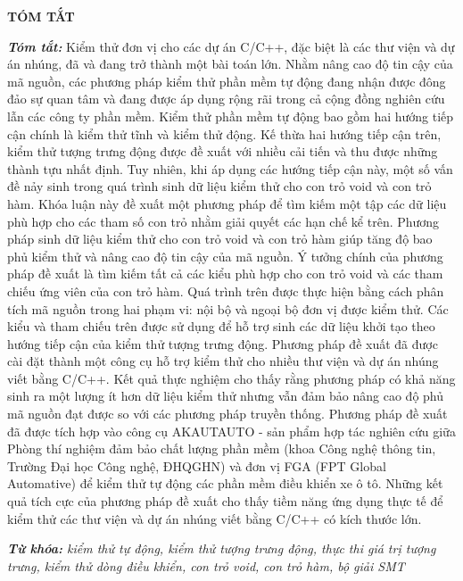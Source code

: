 \newpage
{}
\begin{center}
    \textbf{TÓM TẮT}
\end{center}
\changefontsizes[16pt]{12pt}
\textit{\textbf{Tóm tắt: }} 
Kiểm thử đơn vị cho các dự án C/C++, đặc biệt là các thư viện và dự án nhúng, đã và đang trở thành một bài toán lớn. Nhằm nâng cao độ tin cậy của mã nguồn, các phương pháp kiểm thử phần mềm tự động đang nhận được đông đảo sự quan tâm và đang được áp dụng rộng rãi trong cả cộng đồng nghiên cứu lẫn các công ty phần mềm. Kiểm thử phần mềm tự động bao gồm hai hướng tiếp cận chính là kiểm thử tĩnh và kiểm thử động. Kế thừa hai hướng tiếp cận trên, kiểm thử tượng trưng động được đề xuất với nhiều cải tiến và thu được những thành tựu nhất định. Tuy nhiên, khi áp dụng các hướng tiếp cận này, một số vấn đề nảy sinh trong quá trình sinh dữ liệu kiểm thử cho con trỏ void và con trỏ hàm. Khóa luận này đề xuất một phương pháp để tìm kiếm một tập các dữ liệu phù hợp cho các tham số con trỏ nhằm giải quyết các hạn chế kể trên. Phương pháp sinh dữ liệu kiểm thử cho con trỏ void và con trỏ hàm giúp tăng độ bao phủ kiểm thử và nâng cao độ tin cậy của mã nguồn. Ý tưởng chính của phương pháp đề xuất là tìm kiếm tất cả các kiểu phù hợp cho con trỏ void và các tham chiếu ứng viên của con trỏ hàm. Quá trình trên được thực hiện bằng cách phân tích mã nguồn trong hai phạm vi: nội bộ và ngoại bộ đơn vị được kiểm thử. Các kiểu và tham chiếu trên được sử dụng để hỗ trợ sinh các dữ liệu khởi tạo theo hướng tiếp cận của kiểm thử tượng trưng động. Phương pháp đề xuất đã được cài đặt thành một công cụ hỗ trợ kiểm thử cho nhiều thư viện và dự án nhúng viết bằng C/C++. Kết quả thực nghiệm cho thấy rằng phương pháp có khả năng sinh ra một lượng ít hơn dữ liệu kiểm thử nhưng vẫn đảm bảo nâng cao độ phủ mã nguồn đạt được so với các phương pháp truyền thống. Phương pháp đề xuất đã được tích hợp vào công cụ AKAUTAUTO - sản phẩm hợp tác nghiên cứu giữa Phòng thí nghiệm đảm bảo chất lượng phần mềm (khoa Công nghệ thông tin, Trường Đại học Công nghệ, ĐHQGHN) và đơn vị FGA (FPT Global Automative) để kiểm thử tự động các phần mềm điều khiển xe ô tô. Những kết quả tích cực của phương pháp đề xuất cho thấy tiềm năng ứng dụng thực tế để kiểm thử các thư viện và dự án nhúng viết bằng C/C++ có kích thước lớn.

\vspace{-0.5cm}
\begin{flushleft}
  \textit{\textbf{Từ khóa: } kiểm thử tự động, kiểm thử tượng trưng động, thực thi giá trị tượng trưng, kiểm thử dòng điều khiển, con trỏ void, con trỏ hàm, bộ giải SMT}
\end{flushleft}

